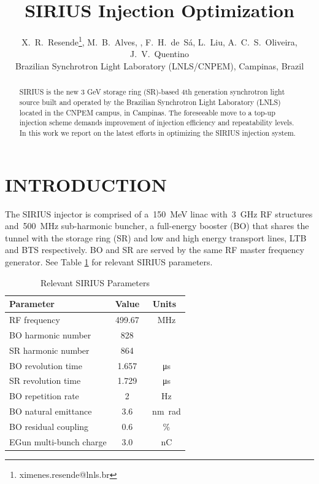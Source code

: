 \documentclass[a4paper,
               keeplastbox,   %
               ]{jacow}
\begin{document}
\title{SIRIUS Injection Optimization}

\author{X.~R.~Resende\thanks{ximenes.resende@lnls.br}, M.~B.~Alves, , F.~H.~de~Sá, L.~Liu, A.~C.~S.~Oliveira, J.~V.~Quentino \\ Brazilian Synchrotron Light Laboratory (LNLS/CNPEM), Campinas, Brazil}
	
\maketitle

%
\begin{abstract}
   SIRIUS is the new 3 GeV storage ring (SR)-based 4th generation synchrotron light source built and operated by the Brazilian Synchrotron Light Laboratory (LNLS) located in the CNPEM campus, in Campinas. The foreseeable move to a top-up injection scheme demands improvement of injection efficiency and repeatability levels. In this work we report on the latest efforts in optimizing the SIRIUS injection system.
\end{abstract}


\section{INTRODUCTION}

The SIRIUS injector is comprised of a~\SI{150}{\mega\electronvolt} linac with~\SI{3}{\giga\hertz} RF structures and~\SI{500}{\mega\hertz} sub-harmonic buncher, a full-energy booster (BO) that shares the tunnel with the storage ring (SR) and low and high energy transport lines, LTB and BTS respectively. BO and SR are served by the same RF master frequency generator. See Table \ref{tab:sirius-params} for relevant SIRIUS parameters.

\begin{table}[!hbt]
   \centering
   \caption{Relevant SIRIUS Parameters}
   \begin{tabular}{lcc}
      \toprule
      \textbf{Parameter} & \textbf{Value} & \textbf{Units}\\
       \midrule
        RF frequency & 499.67 & \SI{}{\mega\hertz} \\ %
        BO harmonic number & 828 & \\
        SR harmonic number & 864 & \\
        BO revolution time & 1.657 & \SI{}{\micro\second} \\
        SR revolution time & 1.729 & \SI{}{\micro\second} \\
        BO repetition rate & 2 & \SI{}{\hertz} \\
        BO natural emittance & 3.6 & \SI{}{\nano\meter\radian} \\
        BO residual coupling & 0.6 & \SI{}{\percent} \\ 
        EGun multi-bunch charge & 3.0 & \SI{}{\nano\coulomb} \\
       \bottomrule
   \end{tabular}
   \label{tab:sirius-params}
\end{table}
\end{document}
